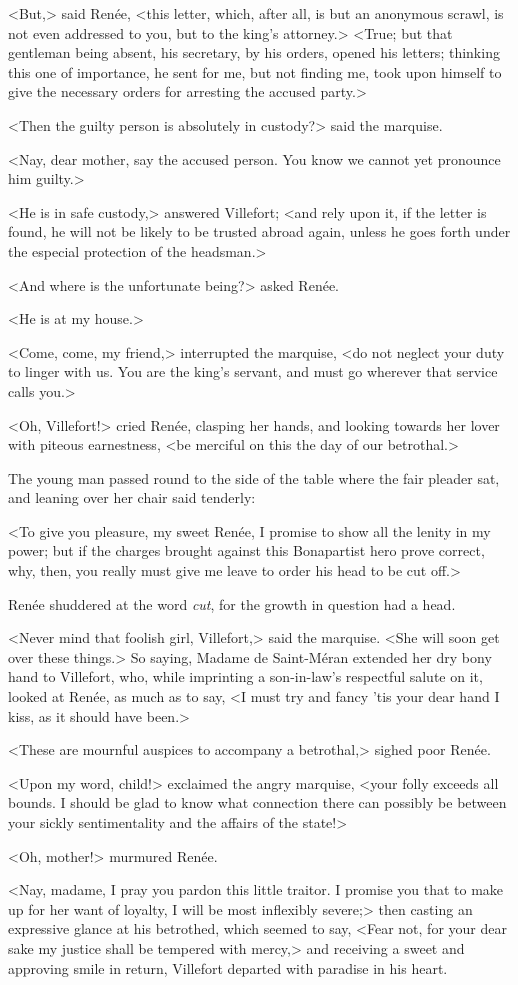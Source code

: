  <But,> said Renée, <this letter, which, after all, is but an anonymous scrawl, is not even addressed to you, but to the king's attorney.>  <True; but that gentleman being absent, his secretary, by his orders, opened his letters; thinking this one of importance, he sent for me, but not finding me, took upon himself to give the necessary orders for arresting the accused party.> 

 <Then the guilty person is absolutely in custody?> said the marquise. 

 <Nay, dear mother, say the accused person. You know we cannot yet pronounce him guilty.> 

 <He is in safe custody,> answered Villefort; <and rely upon it, if the letter is found, he will not be likely to be trusted abroad again, unless he goes forth under the especial protection of the headsman.> 

 <And where is the unfortunate being?> asked Renée. 

 <He is at my house.> 

 <Come, come, my friend,> interrupted the marquise, <do not neglect your duty to linger with us. You are the king's servant, and must go wherever that service calls you.> 

 <Oh, Villefort!> cried Renée, clasping her hands, and looking towards her lover with piteous earnestness, <be merciful on this the day of our betrothal.> 

 The young man passed round to the side of the table where the fair pleader sat, and leaning over her chair said tenderly: 

 <To give you pleasure, my sweet Renée, I promise to show all the lenity in my power; but if the charges brought against this Bonapartist hero prove correct, why, then, you really must give me leave to order his head to be cut off.> 

 Renée shuddered at the word \textit{cut}, for the growth in question had a head. 

 <Never mind that foolish girl, Villefort,> said the marquise. <She will soon get over these things.> So saying, Madame de Saint-Méran extended her dry bony hand to Villefort, who, while imprinting a son-in-law's respectful salute on it, looked at Renée, as much as to say, <I must try and fancy 'tis your dear hand I kiss, as it should have been.> 

 <These are mournful auspices to accompany a betrothal,> sighed poor Renée. 

 <Upon my word, child!> exclaimed the angry marquise, <your folly exceeds all bounds. I should be glad to know what connection there can possibly be between your sickly sentimentality and the affairs of the state!> 

 <Oh, mother!> murmured Renée. 

 <Nay, madame, I pray you pardon this little traitor. I promise you that to make up for her want of loyalty, I will be most inflexibly severe;> then casting an expressive glance at his betrothed, which seemed to say, <Fear not, for your dear sake my justice shall be tempered with mercy,> and receiving a sweet and approving smile in return, Villefort departed with paradise in his heart. 